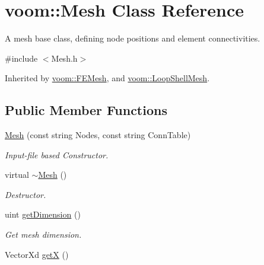 \hypertarget{classvoom_1_1_mesh}{
\section{voom::Mesh Class Reference}
\label{classvoom_1_1_mesh}
}


A mesh base class, defining node positions and element connectivities.  


{\ttfamily \#include $<$Mesh.h$>$}

Inherited by \hyperlink{classvoom_1_1_f_e_mesh}{voom::FEMesh}, and \hyperlink{classvoom_1_1_loop_shell_mesh}{voom::LoopShellMesh}.\subsection*{Public Member Functions}
\begin{DoxyCompactItemize}
\item 
\hypertarget{classvoom_1_1_mesh_acd7aedd7e47324e5b47d9dc6c7cfec77}{
\hyperlink{classvoom_1_1_mesh_acd7aedd7e47324e5b47d9dc6c7cfec77}{Mesh} (const string Nodes, const string ConnTable)}
\label{classvoom_1_1_mesh_acd7aedd7e47324e5b47d9dc6c7cfec77}

\begin{DoxyCompactList}\small\item\em Input-\/file based Constructor. \item\end{DoxyCompactList}\item 
\hypertarget{classvoom_1_1_mesh_ab88def99cb5f96a540aa10ba1f03cf10}{
virtual \hyperlink{classvoom_1_1_mesh_ab88def99cb5f96a540aa10ba1f03cf10}{$\sim$Mesh} ()}
\label{classvoom_1_1_mesh_ab88def99cb5f96a540aa10ba1f03cf10}

\begin{DoxyCompactList}\small\item\em Destructor. \item\end{DoxyCompactList}\item 
\hypertarget{classvoom_1_1_mesh_ab32d805ae4bfe55fe43f361aef3297c8}{
uint \hyperlink{classvoom_1_1_mesh_ab32d805ae4bfe55fe43f361aef3297c8}{getDimension} ()}
\label{classvoom_1_1_mesh_ab32d805ae4bfe55fe43f361aef3297c8}

\begin{DoxyCompactList}\small\item\em Get mesh dimension. \item\end{DoxyCompactList}\item 
\hypertarget{classvoom_1_1_mesh_ad20432a7399b309fd99490b8b58c97ce}{
VectorXd \hyperlink{classvoom_1_1_mesh_ad20432a7399b309fd99490b8b58c97ce}{getX} ()}
\label{classvoom_1_1_mesh_ad20432a7399b309fd99490b8b58c97ce}


\end{DoxyCompactItemize}

